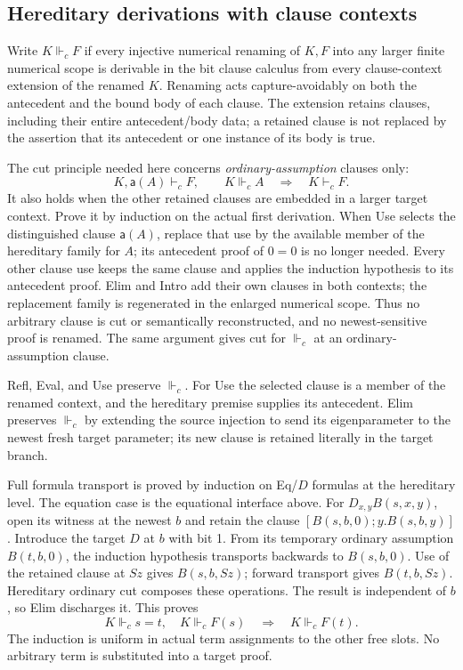 \subsection{Hereditary derivations with clause contexts}

Write $K\Vdash_c F$ if every injective numerical renaming of $K,F$
into any larger finite numerical scope is derivable in the bit clause
calculus from every clause-context extension of the renamed $K$.
Renaming acts capture-avoidably on
both the antecedent and the bound body of each clause.  The extension
retains clauses, including their entire antecedent/body data; a
retained clause is not replaced by the assertion that its antecedent
or one instance of its body is true.

The cut principle needed here concerns \emph{ordinary-assumption}
clauses only:
\[
 K,\mathsf a(A)\vdash_c F,\qquad K\Vdash_c A
 \quad\Longrightarrow\quad K\vdash_c F.
 \tag{UC$_c$}
\]
It also holds when the other retained clauses are embedded in a
larger target context.  Prove it by induction on the actual first
derivation.  When Use selects the distinguished clause
$\mathsf a(A)$, replace that use by the available member of the
hereditary family for $A$; its antecedent proof of $0=0$ is no longer
needed.  Every other clause use keeps the same clause and applies
the induction hypothesis to its antecedent proof.  Elim and Intro
add their own clauses in both contexts; the replacement family is
regenerated in the enlarged numerical scope.  Thus no arbitrary
clause is cut or semantically reconstructed, and no newest-sensitive
proof is renamed.  The same argument gives cut for
$\Vdash_c$ at an ordinary-assumption clause.

Refl, Eval, and Use preserve $\Vdash_c$.  For Use the selected clause
is a member of the renamed context, and the hereditary premise
supplies its antecedent.  Elim preserves $\Vdash_c$ by extending
the source injection to send its eigenparameter to the newest
fresh target parameter; its new clause is retained literally in
the target branch.

Full formula transport is proved by induction on Eq/$D$ formulas
at the hereditary level.  The equation case is the equational
interface above.  For $D_{x,y}B(s,x,y)$, open its witness at the
newest $b$ and retain the clause
$[B(s,b,0);y.B(s,b,y)]$.  Introduce the target $D$ at $b$ with bit 1.
From its temporary ordinary assumption $B(t,b,0)$, the induction
hypothesis transports backwards to $B(s,b,0)$.  Use of the retained
clause at $Sz$ gives $B(s,b,Sz)$; forward transport gives
$B(t,b,Sz)$.  Hereditary ordinary cut composes these operations.
The result is independent of $b$, so Elim discharges it.  This proves
\[
 K\Vdash_c s=t,\quad K\Vdash_c F(s)
 \quad\Longrightarrow\quad K\Vdash_c F(t).
 \tag{HL$_c$}
\]
The induction is uniform in actual term assignments to the other
free slots.  No arbitrary term is substituted into a target proof.

